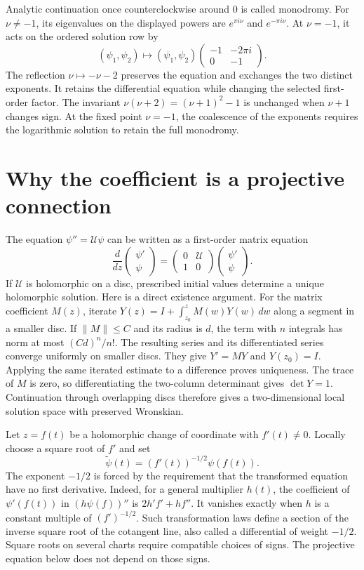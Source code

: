 Analytic continuation once counterclockwise around $0$ is called monodromy.
For $\nu\ne-1$, its eigenvalues on the displayed powers are
$e^{\pi i\nu}$ and $e^{-\pi i\nu}$.
At $\nu=-1$, it acts on the ordered solution row by
\[
 (\psi_1,\psi_2)\longmapsto
 (\psi_1,\psi_2)
 \begin{pmatrix}-1&-2\pi i\\0&-1\end{pmatrix}.
\]
The reflection $\nu\mapsto-\nu-2$ preserves the equation and exchanges the two distinct exponents.
It retains the differential equation while changing the selected first-order factor.
The invariant $\nu(\nu+2)=(\nu+1)^2-1$ is unchanged when $\nu+1$ changes sign.
At the fixed point $\nu=-1$, the coalescence of the exponents requires the logarithmic solution to retain the full monodromy.

\section{Why the coefficient is a projective connection}

The equation $\psi''=\mathcal U\psi$ can be written as a first-order matrix equation
\[
 \frac{d}{dz}\begin{pmatrix}\psi'\\\psi\end{pmatrix}
 =\begin{pmatrix}0&\mathcal U\\1&0\end{pmatrix}
  \begin{pmatrix}\psi'\\\psi\end{pmatrix}.
\]
If $\mathcal U$ is holomorphic on a disc, prescribed initial values determine a unique holomorphic solution.
Here is a direct existence argument.
For the matrix coefficient $M(z)$, iterate
$Y(z)=I+\int_{z_0}^zM(w)Y(w)\,dw$ along a segment in a smaller disc.
If $\|M\|\le C$ and its radius is $d$, the term with $n$ integrals has norm at most $(Cd)^n/n!$.
The resulting series and its differentiated series converge uniformly on smaller discs.
They give $Y'=MY$ and $Y(z_0)=I$.
Applying the same iterated estimate to a difference proves uniqueness.
The trace of $M$ is zero, so differentiating the two-column determinant gives $\det Y=1$.
Continuation through overlapping discs therefore gives a two-dimensional local solution space with preserved Wronskian.

Let $z=f(t)$ be a holomorphic change of coordinate with $f'(t)\ne0$.
Locally choose a square root of $f'$ and set
\[
 \widetilde\psi(t)=(f'(t))^{-1/2}\psi(f(t)).
\]
The exponent $-1/2$ is forced by the requirement that the transformed equation have no first derivative.
Indeed, for a general multiplier $h(t)$, the coefficient of $\psi'(f(t))$ in
$(h\psi(f))''$ is $2h'f'+hf''$.
It vanishes exactly when $h$ is a constant multiple of $(f')^{-1/2}$.
Such transformation laws define a section of the inverse square root of the cotangent line, also called a differential of weight $-1/2$.
Square roots on several charts require compatible choices of signs.
The projective equation below does not depend on those signs.

